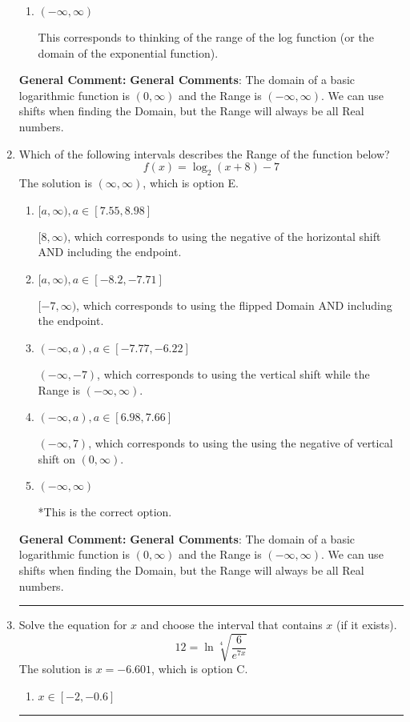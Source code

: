 \documentclass{extbook}[14pt]
\newcommand{\litem}[1]{\item #1

\rule{\textwidth}{0.4pt}}
\begin{document}
\begin{enumerate}
{\begin{enumerate}[label=\Alph*.]
$[-2, \infty)$, which corresponds to using the vertical shift when shifting the Domain AND including the endpoint.
\item \( (-\infty, \infty) \)

This corresponds to thinking of the range of the log function (or the domain of the exponential function).
\end{enumerate}

\textbf{General Comment:} \textbf{General Comments}: The domain of a basic logarithmic function is $(0, \infty)$ and the Range is $(-\infty, \infty)$. We can use shifts when finding the Domain, but the Range will always be all Real numbers.
}
\litem{
Which of the following intervals describes the Range of the function below?
\[ f(x) = \log_2{(x+8)}-7 \]The solution is \( (\infty, \infty) \), which is option E.\begin{enumerate}[label=\Alph*.]
\item \( [a, \infty), a \in [7.55, 8.98] \)

$[8, \infty)$, which corresponds to using the negative of the horizontal shift AND including the endpoint.
\item \( [a, \infty), a \in [-8.2, -7.71] \)

$[-7, \infty)$, which corresponds to using the flipped Domain AND including the endpoint.
\item \( (-\infty, a), a \in [-7.77, -6.22] \)

$(-\infty, -7)$, which corresponds to using the vertical shift while the Range is $(-\infty, \infty)$.
\item \( (-\infty, a), a \in [6.98, 7.66] \)

$(-\infty, 7)$, which corresponds to using the using the negative of vertical shift on $(0, \infty)$.
\item \( (-\infty, \infty) \)

*This is the correct option.
\end{enumerate}

\textbf{General Comment:} \textbf{General Comments}: The domain of a basic logarithmic function is $(0, \infty)$ and the Range is $(-\infty, \infty)$. We can use shifts when finding the Domain, but the Range will always be all Real numbers.
}
\litem{
 Solve the equation for $x$ and choose the interval that contains $x$ (if it exists).
\[  12 = \ln{\sqrt[4]{\frac{6}{e^{7x}}}} \]The solution is \( x = -6.601 \), which is option C.\begin{enumerate}[label=\Alph*.]
\item \( x \in [-2, -0.6] \)


\end{enumerate}}
\end{enumerate}
\end{document}
